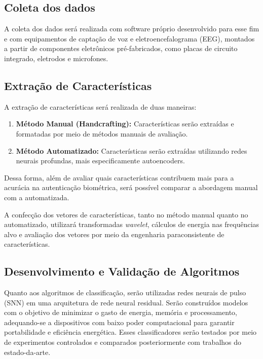 		\subsection{Coleta dos dados}
			\par A coleta dos dados será realizada com software próprio desenvolvido para esse fim e com equipamentos de captação de voz e eletroencefalograma (EEG), montados a partir de componentes eletrônicos pré-fabricados, como placas de circuito integrado, eletrodos e microfones.
	
		\subsection{Extração de Características}
		
			\par A extração de características será realizada de duas maneiras:
			
			\begin{enumerate}
				\item \textbf{Método Manual (Handcrafting):} Características serão extraídas e formatadas por meio de métodos manuais de avaliação.
				\item \textbf{Método Automatizado:} Características serão extraídas utilizando redes neurais profundas, mais especificamente autoencoders.
			\end{enumerate}
			
			\par Dessa forma, além de avaliar quais características contribuem mais para a acurácia na autenticação biométrica, será possível comparar a abordagem manual com a automatizada.
			
			\par A confecção dos vetores de características, tanto no método manual quanto no automatizado, utilizará transformadas \textit{wavelet}, cálculos de energia nas frequências alvo e avaliação dos vetores por meio da engenharia paraconsistente de características.
			
		\subsection{Desenvolvimento e Validação de Algoritmos}
		
			\par Quanto aos algoritmos de classificação, serão utilizadas redes neurais de pulso (SNN) em uma arquitetura de rede neural residual. Serão construídos modelos com o objetivo de minimizar o gasto de energia, memória e processamento, adequando-se a dispositivos com baixo poder computacional para garantir portabilidade e eficiência energética. Esses classificadores serão testados por meio de experimentos controlados e comparados posteriormente com trabalhos do estado-da-arte.
			
